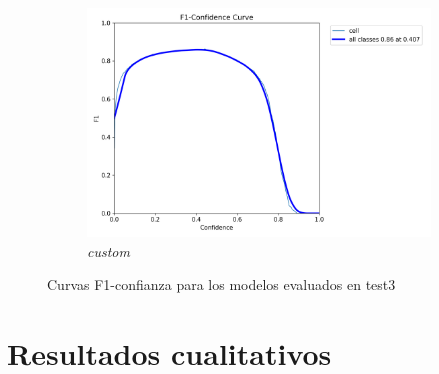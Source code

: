 \documentclass[12pt,a4paper,onecolumn,oneside]{report}
\begin{document}
\begin{figure}[H]
  \vspace{0.5cm}
  \begin{subfigure}[b]{0.48\textwidth}
    \centering
    \includegraphics[width=\textwidth]{figuras/resultados experimentacion/custom/test3/BoxF1_curve.png}
    \caption{\textit{custom}}
    \label{fig:custom_test3}
  \end{subfigure}
  
  \caption{Curvas F1-confianza para los modelos evaluados en test3}
  \label{fig:f1_curves_test3}
\end{figure}

\section{Resultados cualitativos}
\label{sec:Resultados cualitativos anexo}
\end{document}
